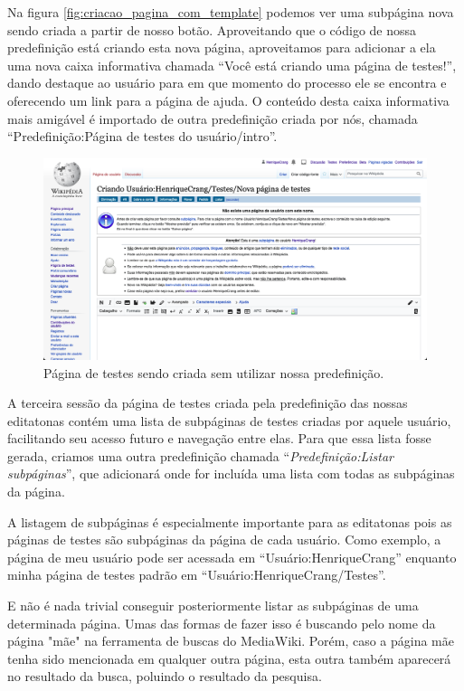 Na figura \ref{fig:criacao_pagina_com_template} podemos ver uma subpágina nova sendo criada a partir de nosso botão. Aproveitando que o código de nossa predefinição está criando esta nova página, aproveitamos para adicionar a ela uma nova caixa informativa chamada ``Você está criando uma página de testes!'', dando destaque ao usuário para em que momento do processo ele se encontra e oferecendo um link para a página de ajuda. O conteúdo desta caixa informativa mais amigável é importado de outra predefinição criada por nós, chamada ``Predefinição:Página de testes do usuário/intro''.

\begin{figure}[H]
    \centering
    \includegraphics[width=1\textwidth]{Images/criacao_pagina_sem_template.png}
    \caption{Página de testes sendo criada sem utilizar nossa predefinição.}
    \label{fig:criacao_pagina_sem_template}
\end{figure}

A terceira sessão da página de testes criada pela predefinição das nossas editatonas contém uma lista de subpáginas de testes criadas por aquele usuário, facilitando seu acesso futuro e navegação entre elas. Para que essa lista fosse gerada, criamos uma outra predefinição chamada ``\textit{Predefinição:Listar subpáginas}'', que adicionará onde for incluída uma lista com todas as subpáginas da página. 

A listagem de subpáginas é especialmente importante para as editatonas pois as páginas de testes são subpáginas da página de cada usuário. Como exemplo, a página de meu usuário pode ser acessada em ``Usuário:HenriqueCrang'' enquanto minha página de testes padrão em ``Usuário:HenriqueCrang/Testes''.

E não é nada trivial conseguir posteriormente listar as subpáginas de uma determinada página. Umas das formas de fazer isso é buscando pelo nome da página "mãe" na ferramenta de buscas do MediaWiki. Porém, caso a página mãe tenha sido mencionada em qualquer outra página, esta outra também aparecerá no resultado da busca, poluindo o resultado da pesquisa.

